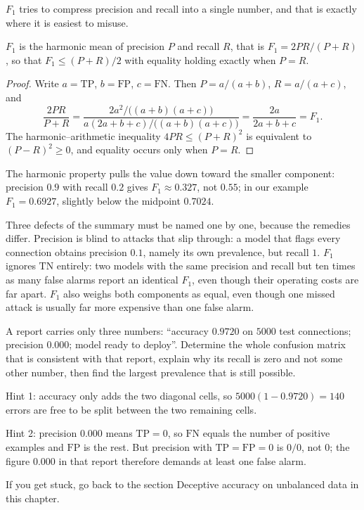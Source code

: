 $F_1$ tries to compress precision and recall into a single number, and that is exactly where it is
easiest to misuse.

\begin{proposisi}
$F_1$ is the harmonic mean of precision $P$ and recall $R$, that is $F_1=2PR/(P+R)$,
so that $F_1\le(P+R)/2$ with equality holding exactly when $P=R$.
\end{proposisi}

\begin{proof}[Proof]
Write $a=\mathrm{TP}$, $b=\mathrm{FP}$, $c=\mathrm{FN}$. Then $P=a/(a+b)$,
$R=a/(a+c)$, and
\[
\frac{2PR}{P+R}
=\frac{2a^2\big/\bigl((a+b)(a+c)\bigr)}{a(2a+b+c)\big/\bigl((a+b)(a+c)\bigr)}
=\frac{2a}{2a+b+c}=F_1 .
\]
The harmonic--arithmetic inequality $4PR\le(P+R)^2$ is equivalent to $(P-R)^2\ge0$, and equality
occurs only when $P=R$.
\end{proof}

The harmonic property pulls the value down toward the smaller component: precision $0.9$ with
recall $0.2$ gives $F_1\approx0.327$, not $0.55$; in our example $F_1=0.6927$, slightly below the
midpoint $0.7024$.

Three defects of the summary must be named one by one, because the remedies differ. Precision is
blind to attacks that slip through: a model that flags every connection obtains precision $0.1$,
namely its own prevalence, but recall $1$. $F_1$ ignores $\mathrm{TN}$ entirely: two models with
the same precision and recall but ten times as many false alarms report an identical $F_1$, even
though their operating costs are far apart. $F_1$ also weighs both components as equal, even though
one missed attack is usually far more expensive than one false alarm.

\begin{tantangan}
A report carries only three numbers: ``accuracy $0.9720$ on $5000$ test connections; precision
$0.000$; model ready to deploy''. Determine the whole confusion matrix that is consistent with
that report, explain why its recall is zero and not some other number, then find the largest
prevalence that is still possible.

Hint 1: accuracy only adds the two diagonal cells, so $5000(1-0.9720)=140$ errors are free to be
split between the two remaining cells.

Hint 2: precision $0.000$ means $\mathrm{TP}=0$, so $\mathrm{FN}$ equals the number of positive
examples and $\mathrm{FP}$ is the rest. But precision with $\mathrm{TP}=\mathrm{FP}=0$ is $0/0$,
not $0$; the figure $0.000$ in that report therefore demands at least one false alarm.

If you get stuck, go back to the section Deceptive accuracy on unbalanced data in this chapter.
\end{tantangan}

